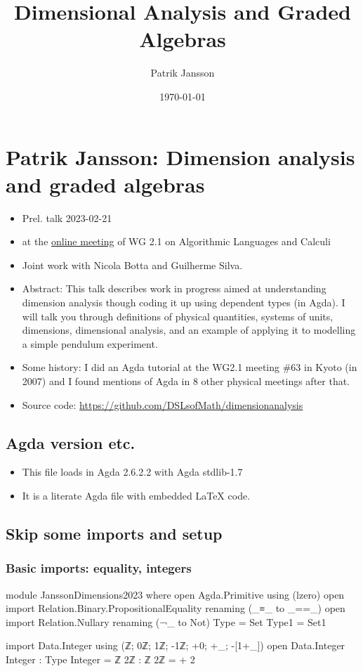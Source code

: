 \documentclass{article}
\author{Patrik Jansson}
\date{\today}
\title{Dimensional Analysis and Graded Algebras}
\begin{document}
\section{Patrik Jansson: Dimension analysis and graded algebras}
\label{sec:org7abdf0f}
\begin{itemize}
\item Prel. talk 2023-02-21
\item at the \href{https://ifipwg21wiki.cs.kuleuven.be/IFIP21/OnlineFeb23}{online meeting} of WG 2.1 on Algorithmic Languages and Calculi
\item Joint work with Nicola Botta and Guilherme Silva.
\item Abstract:
This talk describes work in progress aimed at understanding dimension analysis
though coding it up using dependent types (in Agda). I will talk you through
definitions of physical quantities, systems of units, dimensions, dimensional
analysis, and an example of applying it to modelling a simple pendulum
experiment.
\item Some history: I did an Agda tutorial at the WG2.1 meeting \#63 in Kyoto
(in 2007) and I found mentions of Agda in 8 other physical meetings after
that.
\item Source code: \url{https://github.com/DSLsofMath/dimensionanalysis}
\end{itemize}
\subsection{Agda version etc.}
\label{sec:org0a55a2b}
\begin{itemize}
\item This file loads in Agda 2.6.2.2 with Agda stdlib-1.7
\item It is a literate Agda file with embedded LaTeX code.
\end{itemize}
\subsection{Skip some imports and setup}
\label{sec:orga01e249}
\subsubsection{Basic imports: equality, integers}
\label{sec:org28c6c1b}
\begin{code}
module JanssonDimensions2023 where
open Agda.Primitive using (lzero)
open import Relation.Binary.PropositionalEquality renaming (_≡_ to _==_)
open import Relation.Nullary renaming (¬_ to Not)
Type = Set
Type1 = Set1

import Data.Integer using (ℤ; 0ℤ; 1ℤ; -1ℤ; +0; +_; -[1+_])
open Data.Integer
Integer : Type
Integer = ℤ
2ℤ : ℤ
2ℤ = + 2
\end{code}
\end{document}
